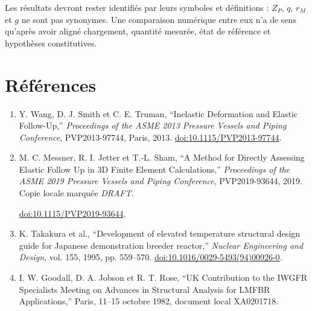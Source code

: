 \documentclass[11pt,a4paper]{article}
\begin{document}
Les résultats devront rester identifiés par leurs symboles et définitions :
\(Z_P\), \(q\), \(r_M\) et \(g\) ne sont pas synonymes. Une comparaison
numérique entre eux n'a de sens qu'après avoir aligné chargement, quantité
mesurée, état de référence et hypothèses constitutives.

\section*{Références}
\begin{enumerate}[leftmargin=1.7em]
\item Y. Wang, D. J. Smith et C. E. Truman, ``Inelastic Deformation and
  Elastic Follow-Up,'' \emph{Proceedings of the ASME 2013 Pressure Vessels and
  Piping Conference}, PVP2013-97744, Paris, 2013.
  \href{https://doi.org/10.1115/PVP2013-97744}{doi:10.1115/PVP2013-97744}.
\item M. C. Messner, R. I. Jetter et T.-L. Sham, ``A Method for Directly
  Assessing Elastic Follow Up in 3D Finite Element Calculations,''
  \emph{Proceedings of the ASME 2019 Pressure Vessels and Piping Conference},
  PVP2019-93644, 2019. Copie locale marquée \emph{DRAFT}.\par
  \href{https://doi.org/10.1115/PVP2019-93644}{doi:10.1115/PVP2019-93644}.
\item K. Takakura et al., ``Development of elevated temperature structural
  design guide for Japanese demonstration breeder reactor,''
  \emph{Nuclear Engineering and Design}, vol. 155, 1995, pp. 559--570.
  \href{https://doi.org/10.1016/0029-5493(94)00926-0}
  {doi:10.1016/0029-5493(94)00926-0}.
\item I. W. Goodall, D. A. Jobson et R. T. Rose, ``UK Contribution to the
  IWGFR Specialists Meeting on Advances in Structural Analysis for LMFBR
  Applications,'' Paris, 11--15 octobre 1982, document local XA0201718.
\end{enumerate}
\end{document}
